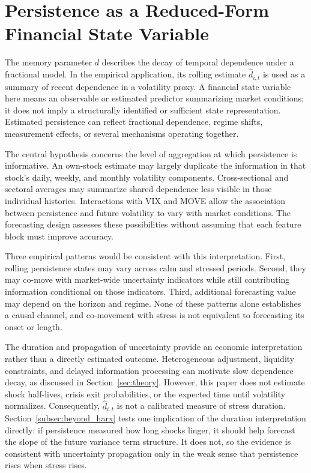 \documentclass[jrfm,article,submit,moreauthors,pdftex]{Definitions/mdpi}
\begin{document}
\section{Persistence as a Reduced-Form Financial State Variable}
\label{sec:structural}

The memory parameter $d$ describes the decay of temporal dependence under a
fractional model. In the empirical application, its rolling estimate
$\hat d_{i,t}$ is used as a summary of recent dependence in a volatility
proxy. A financial state variable here means an observable or estimated
predictor summarizing market conditions; it does not imply a structurally
identified or sufficient state representation. Estimated persistence can
reflect fractional dependence, regime shifts, measurement effects, or
several mechanisms operating together.

The central hypothesis concerns the level of aggregation at which
persistence is informative. An own-stock estimate may largely duplicate
the information in that stock's daily, weekly, and monthly volatility
components. Cross-sectional and sectoral averages may summarize shared
dependence less visible in those individual histories. Interactions with
VIX and MOVE allow the association between persistence and future
volatility to vary with market conditions. The forecasting design assesses
these possibilities without assuming that each feature block must improve
accuracy.

Three empirical patterns would be consistent with this interpretation.
First, rolling persistence states may vary across calm and stressed
periods. Second, they may co-move with market-wide uncertainty indicators
while still contributing information conditional on those indicators.
Third, additional forecasting value may depend on the horizon and regime.
None of these patterns alone establishes a causal channel, and co-movement
with stress is not equivalent to forecasting its onset or length.

The duration and propagation of uncertainty provide an economic
interpretation rather than a directly estimated outcome. Heterogeneous
adjustment, liquidity constraints, and delayed information processing can
motivate slow dependence decay, as discussed in Section~\ref{sec:theory}.
However, this paper does not estimate shock half-lives, crisis exit
probabilities, or the expected time until volatility normalizes.
Consequently, $\hat d_{i,t}$ is not a calibrated measure of stress duration.
Section~\ref{subsec:beyond_harx} tests one implication of the duration
interpretation directly: if persistence measured how long shocks linger, it
should help forecast the slope of the future variance term structure. It
does not, so the evidence is consistent with uncertainty propagation only
in the weak sense that persistence rises when stress rises.
\end{document}
